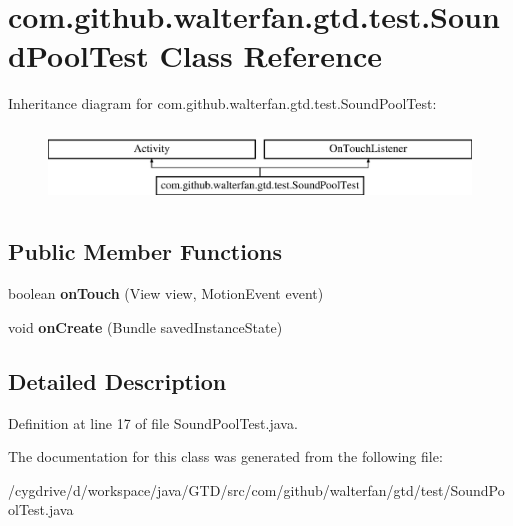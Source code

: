 \hypertarget{classcom_1_1github_1_1walterfan_1_1gtd_1_1test_1_1SoundPoolTest}{\section{com.\-github.\-walterfan.\-gtd.\-test.\-Sound\-Pool\-Test Class Reference}
\label{classcom_1_1github_1_1walterfan_1_1gtd_1_1test_1_1SoundPoolTest}
}
Inheritance diagram for com.\-github.\-walterfan.\-gtd.\-test.\-Sound\-Pool\-Test\-:\begin{figure}[H]
\begin{center}
\leavevmode
\includegraphics[height=2.000000cm]{classcom_1_1github_1_1walterfan_1_1gtd_1_1test_1_1SoundPoolTest}
\end{center}
\end{figure}
\subsection*{Public Member Functions}
\begin{DoxyCompactItemize}
\item 
\hypertarget{classcom_1_1github_1_1walterfan_1_1gtd_1_1test_1_1SoundPoolTest_ae1ca230363b4b7dbd96904a4fb1be056}{boolean {\bfseries on\-Touch} (View view, Motion\-Event event)}\label{classcom_1_1github_1_1walterfan_1_1gtd_1_1test_1_1SoundPoolTest_ae1ca230363b4b7dbd96904a4fb1be056}

\item 
\hypertarget{classcom_1_1github_1_1walterfan_1_1gtd_1_1test_1_1SoundPoolTest_a507ad52810297750faab436e9d46ca5e}{void {\bfseries on\-Create} (Bundle saved\-Instance\-State)}\label{classcom_1_1github_1_1walterfan_1_1gtd_1_1test_1_1SoundPoolTest_a507ad52810297750faab436e9d46ca5e}

\end{DoxyCompactItemize}


\subsection{Detailed Description}


Definition at line 17 of file Sound\-Pool\-Test.\-java.



The documentation for this class was generated from the following file\-:\begin{DoxyCompactItemize}
\item 
/cygdrive/d/workspace/java/\-G\-T\-D/src/com/github/walterfan/gtd/test/Sound\-Pool\-Test.\-java\end{DoxyCompactItemize}

